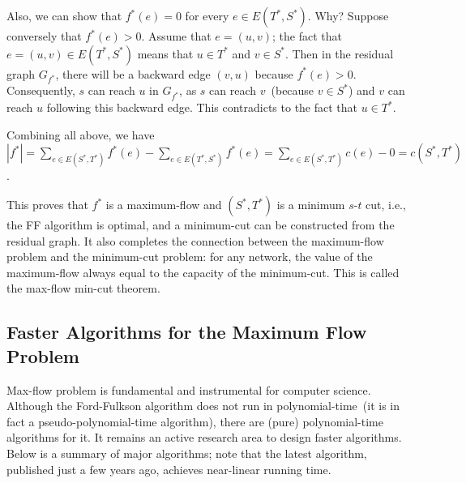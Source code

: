 Also, we can show that $f^*(e) = 0$ for every $e \in E(T^*,S^*)$. %
Why? Suppose conversely that $f^*(e)>0$. Assume that $e=(u,v)$; the fact that $e=(u,v) \in E(T^*,S^*)$ means
that $u \in T^*$ and $v\in S^*$. Then in the residual graph $G_{f^*}$, there will be a backward edge 
$(v, u)$ because $f^*(e) > 0$. Consequently, $s$ can reach $u$ in $G_{f^*}$, as $s$ can reach $v$~(because $v\in S^*$) and $v$ can reach $u$ following this backward edge. 
This contradicts to the fact that $u \in T^*$.

Combining all above, we have 
$|f^*| = \sum_{e\in E(S^*, T^*)} f^*(e) - \sum_{e\in E(T^*, S^*)} f^*(e)
 = \sum_{e\in E(S^*, T^*)} c(e) - 0 = c(S^*, T^*)$.

This proves that $f^*$ is a maximum-flow and $(S^*,T^*)$ is a minimum $s$-$t$ cut, i.e., the
FF algorithm is optimal, and a minimum-cut can be constructed from the residual
graph. It also completes the connection between the maximum-flow problem and
the minimum-cut problem: for any network, the value of the maximum-flow
always equal to the capacity of the minimum-cut. This is called the max-flow
min-cut theorem.

\subsection*{Faster Algorithms for the Maximum Flow Problem}

Max-flow problem is fundamental and instrumental for computer science.
Although the Ford-Fulkson algorithm does not run in polynomial-time~(it is in fact a pseudo-polynomial-time algorithm),
there are (pure) polynomial-time algorithms for it.
It remains an active research area to design faster algorithms.
Below is a summary of major algorithms; note that the latest algorithm,
published just a few years ago, 
achieves near-linear running time.


